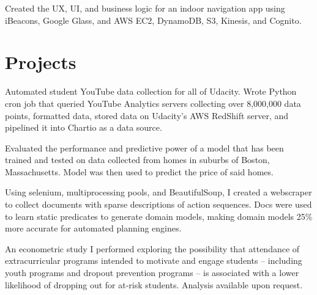\documentclass[]{deedy-resume-openfont}
\begin{document}
\begin{minipage}[t]{0.66\textwidth}
\begin{tightemize}
\item Created the UX, UI, and business logic for an indoor navigation app using iBeacons, Google Glass, and AWS EC2, DynamoDB, S3, Kinesis, and Cognito.
\end{tightemize}
\sectionsep

\section{Projects}

\begin{tightemize}
\item Automated student YouTube data collection for all of Udacity. Wrote Python cron job that queried YouTube Analytics servers collecting over 8,000,000 data points, formatted data, stored data on Udacity's AWS RedShift server, and pipelined it into Chartio as a data source.
\end{tightemize}
\sectionsep

\begin{tightemize}
\item Evaluated the performance and predictive power of a model that has been trained and tested on data collected from homes in suburbs of Boston, Massachusetts. Model was then used to predict the price of said homes.
\end{tightemize}
\sectionsep

\begin{tightemize}
\item Using selenium, multiprocessing pools, and BeautifulSoup, I created a webscraper to collect documents with sparse descriptions of action sequences. Docs were used to learn static predicates to generate domain models, making domain models 25\% more accurate for automated planning engines.
\end{tightemize}
\sectionsep

\begin{tightemize}
\item An econometric study I performed exploring the possibility that attendance of extracurricular programs intended to motivate and engage students – including youth programs and dropout prevention programs – is associated with a lower likelihood of dropping out for at-risk students. Analysis available upon request.
\end{tightemize}
\sectionsep


\end{minipage}
\end{document}
